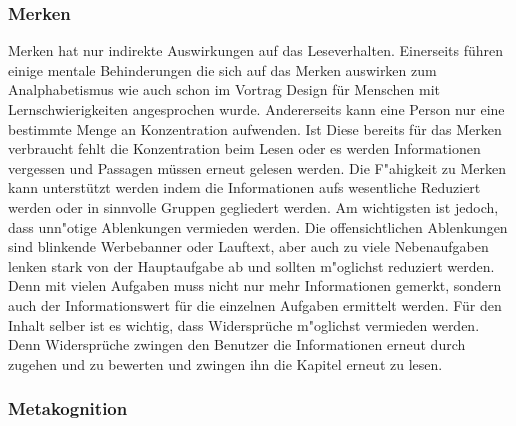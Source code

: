 \subsubsection{Merken}
Merken hat nur indirekte Auswirkungen auf das Leseverhalten. Einerseits führen einige mentale Behinderungen die sich auf das Merken auswirken zum Analphabetismus wie auch schon im Vortrag \glqq Design für Menschen mit Lernschwierigkeiten\grqq{} angesprochen wurde. Andererseits kann eine Person nur eine bestimmte Menge an Konzentration aufwenden. Ist Diese bereits für das Merken verbraucht fehlt die Konzentration beim Lesen oder es werden Informationen vergessen und Passagen müssen erneut gelesen werden. Die F"ahigkeit zu Merken kann unterstützt werden indem die Informationen aufs wesentliche Reduziert werden oder in sinnvolle Gruppen gegliedert werden. Am wichtigsten ist jedoch, dass unn"otige Ablenkungen vermieden werden.
Die offensichtlichen Ablenkungen sind blinkende Werbebanner oder Lauftext, aber auch zu viele Nebenaufgaben lenken stark von der Hauptaufgabe ab und sollten m"oglichst reduziert werden. Denn mit vielen Aufgaben muss nicht nur mehr Informationen gemerkt, sondern auch der Informationswert für die einzelnen Aufgaben ermittelt werden. Für den Inhalt selber ist es wichtig, dass Widersprüche m"oglichst vermieden werden. Denn Widersprüche zwingen den Benutzer die Informationen erneut durch zugehen und zu bewerten und zwingen ihn die Kapitel erneut zu lesen.

\subsubsection{Metakognition}


